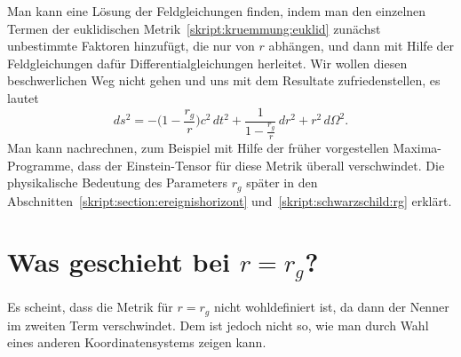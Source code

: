 Man kann eine Lösung der Feldgleichungen finden, indem man den
einzelnen Termen der euklidischen Metrik~\eqref{skript:kruemmung:euklid}
zunächst unbestimmte Faktoren hinzufügt, die nur von $r$ abhängen,
und dann mit Hilfe der Feldgleichungen dafür Differentialgleichungen
herleitet.
Wir wollen diesen beschwerlichen Weg nicht gehen und uns mit dem
Resultate zufriedenstellen, es lautet
\begin{equation}
ds^2
=
-\biggl(1-\frac{r_g}r\biggr)c^2\,dt^2
+\frac1{\displaystyle 1-\frac{r_g}r}\,dr^2 + r^2\,d\Omega^2.
\label{skript:kruemmung:schwarzschildmetrik}
\end{equation}
Man kann nachrechnen, zum Beispiel mit Hilfe der früher vorgestellen
Maxima-Programme, dass der Einstein-Tensor für diese Metrik überall
verschwindet.
Die physikalische Bedeutung des Parameters $r_g$ später in
den Abschnitten~\ref{skript:section:ereignishorizont}
und~\ref{skript:schwarzschild:rg} erklärt.

\section{Was geschieht bei $r=r_g$?}
Es scheint, dass die Metrik für $r=r_g$ nicht wohldefiniert ist,
da dann der Nenner im zweiten Term verschwindet.
Dem ist jedoch nicht so, wie man durch Wahl eines anderen Koordinatensystems
zeigen kann.

